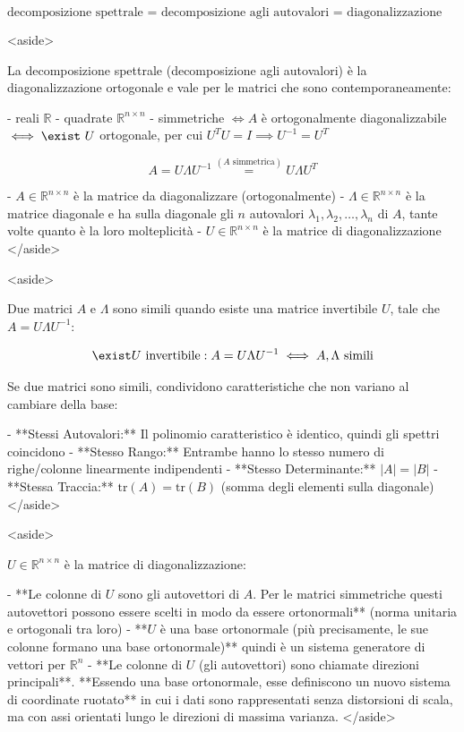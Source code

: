 $$
\text{decomposizione spettrale = decomposizione agli autovalori = diagonalizzazione ortogonale}
$$

<aside>


La decomposizione spettrale (decomposizione agli autovalori) è la diagonalizzazione ortogonale e vale per le matrici che sono contemporaneamente:

- reali $\mathbb{R}$
- quadrate $\mathbb{R}^{n\times n}$
- simmetriche $\iff$$A$ è ortogonalmente diagonalizzabile$\iff\exist\ U$ ortogonale, per cui $U^TU=I\implies U^{-1}=U^T$

$$
A=U\Lambda U^{-1}\overset{(A\text{ simmetrica})}{=}U\Lambda U^T
$$

- $A\in\mathbb{R}^{n\times n}$ è la matrice da diagonalizzare (ortogonalmente)
- $\Lambda\in\mathbb{R}^{n\times n}$ è la matrice diagonale e ha sulla diagonale gli $n$ autovalori $\lambda_1, \lambda_2, \dots, \lambda_n$ di $A$, tante volte quanto è la loro molteplicità
- $U\in\mathbb{R}^{n\times n}$ è la matrice di diagonalizzazione
</aside>

<aside>


Due matrici $A$ e $\Lambda$ sono simili quando esiste una matrice invertibile $U$, tale che $A=U\Lambda U^{-1}$:

$$
\exist U\text{ invertibile} :A=U\Lambda U^{-1}\iff A,\Lambda\text{ simili}
$$

Se due matrici sono simili, condividono caratteristiche che non variano al cambiare della base:

- **Stessi Autovalori:** Il polinomio caratteristico è identico, quindi gli spettri coincidono
- **Stesso Rango:** Entrambe hanno lo stesso numero di righe/colonne linearmente indipendenti
- **Stesso Determinante:** $|A| = |B|$
- **Stessa Traccia:** $\text{tr}(A) = \text{tr}(B)$ (somma degli elementi sulla diagonale)
</aside>

<aside>


$U\in\mathbb{R}^{n\times n}$ è la matrice di diagonalizzazione:

- **Le colonne di $U$ sono gli autovettori di $A$. Per le matrici simmetriche questi autovettori possono essere scelti in modo da essere ortonormali** (norma unitaria e ortogonali tra loro)
- **$U$ è una base ortonormale (più precisamente, le sue colonne formano una base ortonormale)** quindi è un sistema generatore di vettori per $\mathbb{R}^n$
- **Le colonne di $U$ (gli autovettori) sono chiamate direzioni principali**. **Essendo una base ortonormale, esse definiscono un nuovo sistema di coordinate ruotato** in cui i dati sono rappresentati senza distorsioni di scala, ma con assi orientati lungo le direzioni di massima varianza.
</aside>

